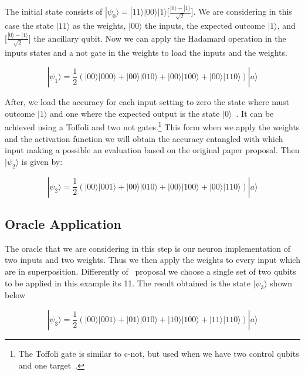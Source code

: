 \documentclass[conference]{IEEEtran}
\begin{document}
The initial state consists of \(|\psi_0\rangle = |11\rangle|00\rangle|1\rangle\Big[\frac{|0\rangle - |1\rangle}{\sqrt{2}}\Big]\).
We are considering in this case the state \(|11\rangle\) as the weights, \(|00\rangle\) the inputs, the expected outcome \(|1\rangle\), and
\(\Big[\frac{|0\rangle - |1\rangle}{\sqrt{2}}\Big]\) the ancillary qubit.
Now we can apply the Hadamard operation in the inputs states and a not gate in the weights to load the inputs and the weights.

\begin{equation}
|\psi_1\rangle = \frac{1}{2}(|00\rangle|000\rangle + |00\rangle|010\rangle + |00\rangle|100\rangle + |00\rangle|110\rangle)
|a\rangle
\end{equation}

After, we load the accuracy for each input setting to zero the state where must outcome \(|1\rangle\) and one where the
expected output is the state $|0\rangle$~\cite{fawaz2019training}.
It can be achieved using a Toffoli and two not gates.\footnote{The Toffoli gate is similar to c-not, but used when we have
two control qubits and one target~\cite{yanofsky2008quantum}.}
This form when we apply the weights and the activation function we will obtain the accuracy entangled with which input
making a possible an evaluation based on the original paper proposal.
Then \(|\psi_2\rangle\) is given by:

\begin{equation}
|\psi_2\rangle = \frac{1}{2}(|00\rangle|001\rangle + |00\rangle|010\rangle + |00\rangle|100\rangle + |00\rangle|110\rangle)
|a\rangle
\end{equation}

\subsection{Oracle Application}\label{subsec:oracle-application}

The oracle that we are considering in this step is our neuron implementation of two inputs and two weights.
Thus we then apply the weights to every input which are in superposition.
Differently of~\cite{fawaz2019training} proposal we choose a single set of two qubits to be applied in this example its 11.
The result obtained is the state $|\psi_3\rangle$ shown below

\begin{equation}
|\psi_3\rangle = \frac{1}{2}(|00\rangle|001\rangle + |01\rangle|010\rangle + |10\rangle|100\rangle + |11\rangle|110\rangle)
|a\rangle
\end{equation}
\end{document}
